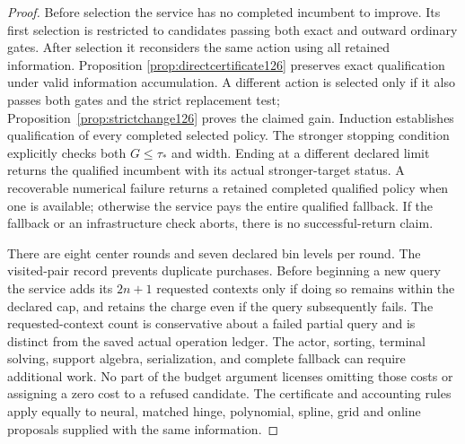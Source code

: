\begin{proof}
Before selection the service has no completed incumbent to improve.
Its first selection is restricted to candidates passing both exact
and outward ordinary gates.  After selection it reconsiders the
same action using all retained information.  Proposition
\ref{prop:directcertificate126} preserves exact qualification under
valid information accumulation.  A different action is selected
only if it also passes both gates and the strict replacement test;
Proposition~\ref{prop:strictchange126} proves the claimed gain.
Induction establishes qualification of every completed selected
policy.  The stronger stopping condition explicitly checks both
$G\le\tau_*$ and width.  Ending at a different declared limit
returns the qualified incumbent with its actual stronger-target
status.  A recoverable numerical failure returns a retained
completed qualified policy when one is available; otherwise the
service pays the entire qualified fallback.  If the fallback or an
infrastructure check aborts, there is no successful-return claim.

There are eight center rounds and seven declared bin levels per
round.  The visited-pair record prevents duplicate purchases.
Before beginning a new query the service adds its $2n+1$ requested
contexts only if doing so remains within the declared cap, and
retains the charge even if the query subsequently fails.  The
requested-context count is conservative about a failed partial
query and is distinct from the saved actual operation ledger.
The actor, sorting, terminal solving, support algebra, serialization,
and complete fallback can require additional work.  No part of the
budget argument licenses omitting those costs or assigning a zero
cost to a refused candidate.  The certificate and accounting rules
apply equally to neural, matched hinge, polynomial, spline, grid
and online proposals supplied with the same information.
\end{proof}
